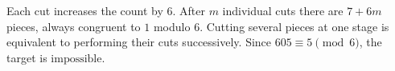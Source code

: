 Each cut increases the count by $6$. After $m$ individual cuts there are $7+6m$ pieces, always congruent to $1$ modulo $6$. Cutting several pieces at one stage is equivalent to performing their cuts successively. Since $605\equiv5\pmod6$, the target is $\boxed{\text{impossible}}$.
